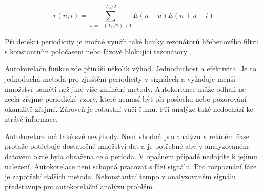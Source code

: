     \begin{equation}
      r(n,i) = \sum_{u = -(T_w / 2) + 1}^{T_w / 2} E(n+u)E(n+u-i)
      \label{rov:autocorelation}
    \end{equation}

    Při detekci periodicity je možné využít také banky rezonátorů hřebenového filtru s konstantním poločasem \cite{Tempo_and_beat_analysis_of_acoustic_musical_signals} nebo fázově blokující rezonátory \cite{Resonance_and_the_perciption_of_musical_meter}.


    Autokorelačn funkce zde přináší několik výhod. Jednoduchost a efektivita. Je to jednoduchá metoda pro zjisštění periodicity v signálech a vyžaduje menší množství paměti než jiné víše zmíněné metody. Autokorelace může odhali ne zcela zřejmé periodické vzory, které nemusí být při poslechu nebo pozorování okamžitě zřejmé. Zároveň je robustní vůči šumu. Při analýze také nedochází ke ztrátě informace. \cite{Tempo_and_metrical_analzsis_by_tracking_multiple_metrical_levels_using_autocorrelation}
    
    Autokorelace má také své nevýhody. Není vhodná pro analýzu v reláném čase protože potřebuje dostatečné množství dat a je potřebné aby v analyzovaném datovém okně byla obsažena celá perioda. V opačném případě nedojdte k jejímu nalezení. Autokorelace není schopná pracovat s fází signálu. Pro rozpoznání fáze je zapotřebí dalších metoda. Nekonstantní tempo v analyzovaném signálu představuje pro autokorelační analýzu problém.\cite{Tempo_and_metrical_analzsis_by_tracking_multiple_metrical_levels_using_autocorrelation}


  


